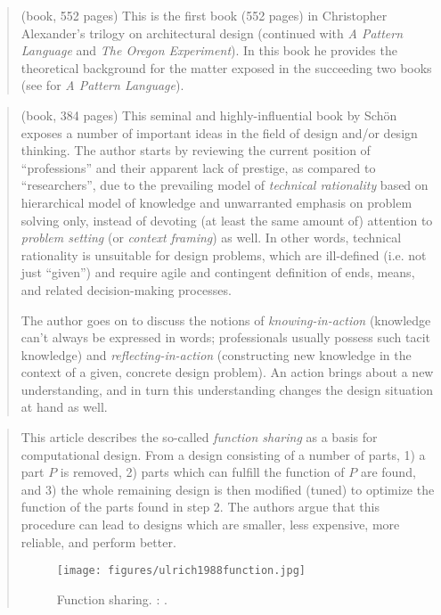 		\begin{quote}
		\small
		(book, 552 pages) 
	    This is the first book (552 pages) in Christopher Alexander's trilogy on architectural design 
	    (continued with {\em A Pattern Language} and {\em The Oregon Experiment}). 
	    In this book he provides the theoretical background 
	    for the matter exposed in the succeeding two books (see \cite{alexander1977pattern}
	    for {\em A Pattern Language}).
		\end{quote}

		\begin{quote}
		\small
		(book, 384 pages) 
	    This seminal and highly-influential book by Sch{\"o}n exposes a number of important ideas
	    in the field of design and/or design thinking.
	    The author starts by reviewing the current position of ``professions'' and their
	    apparent lack of prestige, as compared to ``researchers'', due to the prevailing
	    model of {\em technical rationality} based on hierarchical model of knowledge and
	    unwarranted emphasis on problem solving only, instead of devoting (at least the same
	    amount of) attention to {\em problem setting} (or {\em context framing}) as well.
	    In other words, technical rationality is unsuitable for design problems, which 
	    are ill-defined (i.e. not just ``given'') and require agile and contingent
	    definition of ends, means, and related decision-making processes.
	    
	    The author goes on to discuss the notions of {\em knowing-in-action} 
	    (knowledge can't always be expressed in words; professionals usually possess such tacit knowledge) 
	    and {\em reflecting-in-action} (constructing new knowledge in the context of
	    a given, concrete design problem). An action brings about a new understanding,
	    and in turn this understanding changes the design situation at hand as well.
		\end{quote}

		\begin{quote}
		\small
	    This article describes the so-called \emph{function sharing} as a basis for computational design.
	    From a design consisting of a number of parts,
	    1) a part $P$ is removed,
	    2) parts which can fulfill the function of $P$ are found, and
	    3) the whole remaining design is then modified (tuned) to optimize the 
	    function of the parts found in step 2.
	    The authors argue that this procedure can lead to designs which 
	    are smaller, less expensive, more reliable, and perform better.
		\begin{figure}[htb]
		\begin{center}
		\texttt{[image: figures/ulrich1988function.jpg]}
		\caption{Function sharing. 
		\citeauthor{ulrich1988function}:
		\cite{ulrich1988function}.}
		\label{fig:ulrich1988function}
		\end{center}
		\end{figure}	    
		\end{quote}


